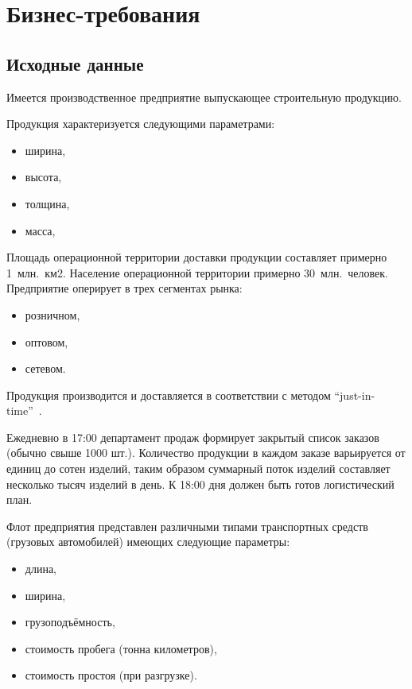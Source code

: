 \chapter{Бизнес-требования}
\label{ch:chap1}


\section{Исходные данные}
\label{sec:asis}

Имеется производственное предприятие выпускающее строительную продукцию.

Продукция характеризуется следующими параметрами:
\begin{itemize}
    \item ширина,
    \item высота,
    \item толщина,
    \item масса,
\end{itemize}

Площадь операционной территории доставки продукции составляет примерно 1~млн.~км2.
Население операционной территории примерно 30~млн.~человек.
Предприятие оперирует в трех сегментах рынка:
\begin{itemize}
    \item розничном,
    \item оптовом,
    \item сетевом.
\end{itemize}

Продукция производится и доставляется в соответствии с методом “just-in-time”~\cite{jit}.

Ежедневно в 17:00 департамент продаж формирует закрытый список заказов (обычно свыше 1000 шт.).
Количество продукции в каждом заказе варьируется от единиц до сотен изделий,
таким образом суммарный поток изделий составляет несколько тысяч изделий в день.
К 18:00 дня должен быть готов логистический план.

Флот предприятия представлен различными типами транспортных средств (грузовых автомобилей) имеющих следующие параметры:
\begin{itemize}
    \item длина,
    \item ширина,
    \item грузоподъёмность,
    \item стоимость пробега (тонна километров),
    \item стоимость простоя (при разгрузке).
\end{itemize}

